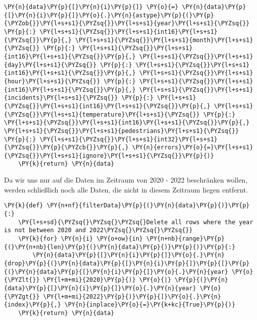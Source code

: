 \begin{tcolorbox}[breakable, size=fbox, boxrule=1pt, pad at break*=1mm,colback=cellbackground, colframe=cellborder]
\begin{Verbatim}[commandchars=\\\{\}]
        \PY{n}{data}\PY{p}{[}\PY{n}{i}\PY{p}{]} \PY{o}{=} \PY{n}{data}\PY{p}{[}\PY{n}{i}\PY{p}{]}\PY{o}{.}\PY{n}{astype}\PY{p}{(}\PY{p}{\PYZob{}}\PY{l+s+s1}{\PYZsq{}}\PY{l+s+s1}{year}\PY{l+s+s1}{\PYZsq{}} \PY{p}{:} \PY{l+s+s1}{\PYZsq{}}\PY{l+s+s1}{int16}\PY{l+s+s1}{\PYZsq{}}\PY{p}{,} \PY{l+s+s1}{\PYZsq{}}\PY{l+s+s1}{month}\PY{l+s+s1}{\PYZsq{}} \PY{p}{:} \PY{l+s+s1}{\PYZsq{}}\PY{l+s+s1}{int16}\PY{l+s+s1}{\PYZsq{}}\PY{p}{,} \PY{l+s+s1}{\PYZsq{}}\PY{l+s+s1}{day}\PY{l+s+s1}{\PYZsq{}} \PY{p}{:} \PY{l+s+s1}{\PYZsq{}}\PY{l+s+s1}{int16}\PY{l+s+s1}{\PYZsq{}}\PY{p}{,} \PY{l+s+s1}{\PYZsq{}}\PY{l+s+s1}{hour}\PY{l+s+s1}{\PYZsq{}} \PY{p}{:} \PY{l+s+s1}{\PYZsq{}}\PY{l+s+s1}{int16}\PY{l+s+s1}{\PYZsq{}}\PY{p}{,} \PY{l+s+s1}{\PYZsq{}}\PY{l+s+s1}{incidents}\PY{l+s+s1}{\PYZsq{}} \PY{p}{:} \PY{l+s+s1}{\PYZsq{}}\PY{l+s+s1}{int16}\PY{l+s+s1}{\PYZsq{}}\PY{p}{,} \PY{l+s+s1}{\PYZsq{}}\PY{l+s+s1}{temperature}\PY{l+s+s1}{\PYZsq{}} \PY{p}{:} \PY{l+s+s1}{\PYZsq{}}\PY{l+s+s1}{int16}\PY{l+s+s1}{\PYZsq{}}\PY{p}{,} \PY{l+s+s1}{\PYZsq{}}\PY{l+s+s1}{pedestrians}\PY{l+s+s1}{\PYZsq{}} \PY{p}{:} \PY{l+s+s1}{\PYZsq{}}\PY{l+s+s1}{int32}\PY{l+s+s1}{\PYZsq{}}\PY{p}{\PYZcb{}}\PY{p}{,} \PY{n}{errors}\PY{o}{=}\PY{l+s+s1}{\PYZsq{}}\PY{l+s+s1}{ignore}\PY{l+s+s1}{\PYZsq{}}\PY{p}{)}
    \PY{k}{return} \PY{n}{data}
\end{Verbatim}
\end{tcolorbox}

    Da wir uns nur auf die Daten im Zeitraum von 2020 - 2022 beschränken
wollen, werden schließlich noch alle Daten, die nicht in diesem Zeitraum
liegen entfernt.

    \begin{tcolorbox}[breakable, size=fbox, boxrule=1pt, pad at break*=1mm,colback=cellbackground, colframe=cellborder]
\begin{Verbatim}[commandchars=\\\{\}]
\PY{k}{def} \PY{n+nf}{filterData}\PY{p}{(}\PY{n}{data}\PY{p}{)}\PY{p}{:}
    \PY{l+s+sd}{\PYZsq{}\PYZsq{}\PYZsq{}Delete all rows where the year is not between 2020 and 2022\PYZsq{}\PYZsq{}\PYZsq{}}
    \PY{k}{for} \PY{n}{i} \PY{o+ow}{in} \PY{n+nb}{range}\PY{p}{(}\PY{n+nb}{len}\PY{p}{(}\PY{n}{data}\PY{p}{)}\PY{p}{)}\PY{p}{:}
        \PY{n}{data}\PY{p}{[}\PY{n}{i}\PY{p}{]}\PY{o}{.}\PY{n}{drop}\PY{p}{(}\PY{n}{data}\PY{p}{[}\PY{n}{i}\PY{p}{]}\PY{p}{[}\PY{p}{(}\PY{n}{data}\PY{p}{[}\PY{n}{i}\PY{p}{]}\PY{o}{.}\PY{n}{year} \PY{o}{\PYZlt{}} \PY{l+m+mi}{2020}\PY{p}{)} \PY{o}{|} \PY{p}{(}\PY{n}{data}\PY{p}{[}\PY{n}{i}\PY{p}{]}\PY{o}{.}\PY{n}{year} \PY{o}{\PYZgt{}} \PY{l+m+mi}{2022}\PY{p}{)}\PY{p}{]}\PY{o}{.}\PY{n}{index}\PY{p}{,} \PY{n}{inplace}\PY{o}{=}\PY{k+kc}{True}\PY{p}{)}
    \PY{k}{return} \PY{n}{data}
\end{Verbatim}
\end{tcolorbox}

